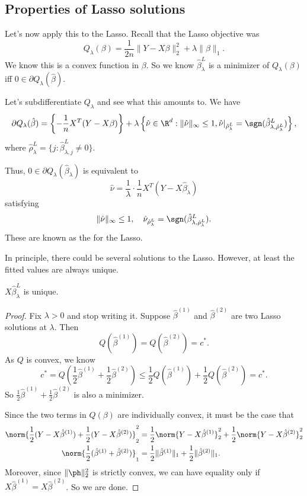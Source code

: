 \documentclass[a4paper]{article}
\begin{document}
\subsection{Properties of Lasso solutions}
Let's now apply this to the Lasso. Recall that the Lasso objective was
\[
  Q_\lambda (\beta) = \frac{1}{2n} \|Y - X \beta\|_2^2 + \lambda \|\beta\|_1.
\]
We know this is a convex function in $\beta$. So we know $\hat{\beta}_\lambda^L$ is a minimizer of $Q_\lambda(\beta)$ iff $0 \in \partial Q_\lambda(\hat{\beta})$.

Let's subdifferentiate $Q_\lambda$ and see what this amounts to. We have
\[
  \partial Q_\lambda(\hat{\beta}) = \left\{-\frac{1}{n}X^T(Y - X \beta)\right\} + \lambda \left\{\hat{\nu} \in \R^d: \|\hat{\nu}\|_\infty \leq 1, \hat{\nu}|_{\hat{\rho}_\lambda^L} = \sgn (\hat{\beta}_{\lambda, \hat{\rho}_\lambda^L}^L)\right\},
\]
where $\hat{\rho}_\lambda^L = \{j : \hat{\beta}_{\lambda, j}^L \not= 0\}$. %

Thus, $0 \in \partial Q_\lambda (\hat{\beta}_\lambda)$ is equivalent to
\[
  \hat{\nu} = \frac{1}{\lambda} \cdot \frac{1}{n} X^T (Y - X \hat{\beta}_\lambda)
\]
satisfying
\[
  \|\hat{\nu}\|_{\infty} \leq 1,\quad \hat{\nu}_{\hat{\rho}_\lambda^L} = \sgn (\hat{\beta}_{\lambda, \hat{\rho}^L_\lambda}^L).
\]
These are known as the  for the Lasso.

In principle, there could be several solutions to the Lasso. However, at least the fitted values are always unique.

\begin{prop}
  $X \hat{\beta}_\lambda^L$ is unique.
\end{prop}
\begin{proof}
  Fix $\lambda > 0$ and stop writing it. Suppose $\hat{\beta}^{(1)}$ and $\hat{\beta}^{(2)}$ are two Lasso solutions at $\lambda$. Then
  \[
    Q(\hat{\beta}^{(1)}) = Q(\hat{\beta}^{(2)}) = c^*.
  \]
  As $Q$ is convex, we know
  \[
    c^* = Q\left(\frac{1}{2} \hat{\beta}^{(1)} + \frac{1}{2} \hat{\beta}^{(2)}\right) \leq \frac{1}{2} Q(\hat{\beta}^{(1)}) + \frac{1}{2} Q(\hat{\beta}^{(2)}) = c^*.
  \]
  So $\frac{1}{2} \hat{\beta}^{(1)} + \frac{1}{2} \hat{\beta}^{(2)}$ is also a minimizer.

  Since the two terms in $Q(\beta)$ are individually convex, it must be the case that
  \begin{align*}
    \norm{\frac{1}{2} (Y - X\hat{\beta}^{(1)}) + \frac{1}{2} (Y - X \hat{\beta}^{(2)})}_2^2 &= \frac{1}{2} \norm{Y - X \hat{\beta}^{(1)}}_2^2 + \frac{1}{2} \norm{Y - X \hat{\beta}^{(2)}}_2^2\\
    \norm{\frac{1}{2} (\hat{\beta}^{(1)} + \hat{\beta}^{(2)})}_1 &= \frac{1}{2} \|\hat{\beta}^{(1)}\|_1 + \frac{1}{2} \|\hat{\beta}^{(2)}\|_1.
  \end{align*}
  Moreover, since $\|\ph\|_2^2$ is strictly convex, we can have equality only if $X \hat{\beta}^{(1)} = X \hat{\beta}^{(2)}$. So we are done.
\end{proof}
\end{document}
